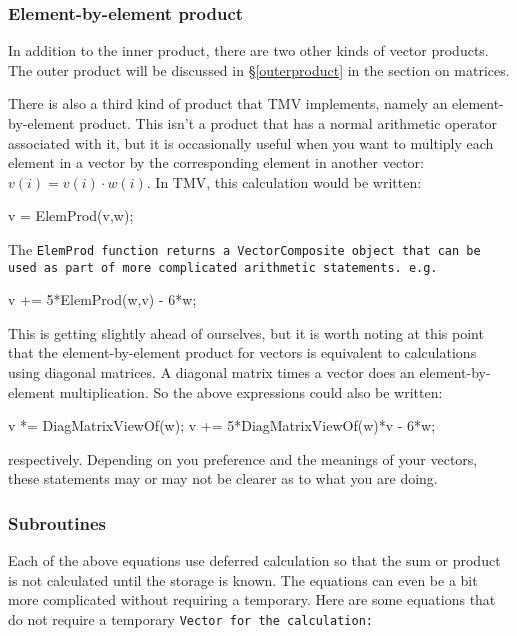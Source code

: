 \subsubsection{Element-by-element product}
\label{VectorElementProd}

In addition to the inner product, there are two other kinds of vector products.  The outer product will be discussed in \S\ref{outerproduct} in the section on matrices.

There is also a third kind of product that TMV implements, namely an element-by-element product.  This isn't a product that has a normal arithmetic operator associated with it, but it is occasionally useful when you want to multiply each element in a vector by the corresponding element in another vector: $v(i) = v(i) \cdot w(i)$.  In TMV, this calculation would be written:
\begin{tmvcode}
v = ElemProd(v,w);
\end{tmvcode}

The \tt{ElemProd} function returns a \tt{VectorComposite} object that can be used as part of more complicated arithmetic statements.  e.g.
\begin{tmvcode}
v += 5*ElemProd(w,v) - 6*w;
\end{tmvcode}

This is getting slightly ahead of ourselves, but it is worth noting at this point that the element-by-element product for vectors is equivalent to calculations using diagonal matrices.  A diagonal matrix times a vector does an element-by-element multiplication.  So the above expressions could also be written:
\begin{tmvcode}
v *= DiagMatrixViewOf(w);
v += 5*DiagMatrixViewOf(w)*v - 6*w;
\end{tmvcode}
respectively.  Depending on you preference and the meanings of your vectors,
these statements may or may not be clearer as to what you are doing.

\subsubsection{Subroutines}

Each of the above equations use deferred calculation so that the sum or product is not calculated
until the storage is known.  The equations can even be a bit more complicated without 
requiring a temporary.  Here are some equations that do not require a temporary 
\tt{Vector} for the calculation:

